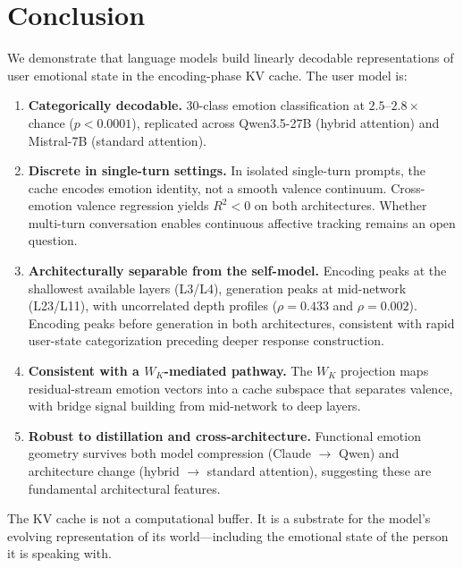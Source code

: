 \documentclass[11pt,a4paper]{article}
\begin{document}
\section{Conclusion}

We demonstrate that language models build linearly decodable representations of user emotional state in the encoding-phase KV cache. The user model is:

\begin{enumerate}[nosep]
    \item \textbf{Categorically decodable.} 30-class emotion classification at $2.5$--$2.8\times$ chance ($p < 0.0001$), replicated across Qwen3.5-27B (hybrid attention) and Mistral-7B (standard attention).
    \item \textbf{Discrete in single-turn settings.} In isolated single-turn prompts, the cache encodes emotion identity, not a smooth valence continuum. Cross-emotion valence regression yields $R^2 < 0$ on both architectures. Whether multi-turn conversation enables continuous affective tracking remains an open question.
    \item \textbf{Architecturally separable from the self-model.} Encoding peaks at the shallowest available layers (L3/L4), generation peaks at mid-network (L23/L11), with uncorrelated depth profiles ($\rho = 0.433$ and $\rho = 0.002$). Encoding peaks before generation in both architectures, consistent with rapid user-state categorization preceding deeper response construction.
    \item \textbf{Consistent with a $W_K$-mediated pathway.} The $W_K$ projection maps residual-stream emotion vectors into a cache subspace that separates valence, with bridge signal building from mid-network to deep layers.
    \item \textbf{Robust to distillation and cross-architecture.} Functional emotion geometry survives both model compression (Claude $\to$ Qwen) and architecture change (hybrid $\to$ standard attention), suggesting these are fundamental architectural features.
\end{enumerate}

The KV cache is not a computational buffer. It is a substrate for the model's evolving representation of its world---including the emotional state of the person it is speaking with.


\end{document}
